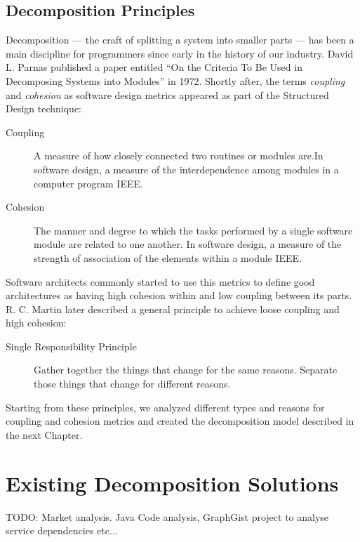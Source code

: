 

\subsection{Decomposition Principles}

Decomposition --- the craft of splitting a system into smaller parts --- has been a main discipline for programmers since early in the history of our industry. David L. Parnas published a paper entitled \enquote{On the Criteria To Be Used in Decomposing Systems into Modules} in 1972\cite{parnaDecomposing}. Shortly after, the terms \textit{coupling} 
and \textit{cohesion} as software design metrics appeared as part of the Structured Design technique\cite{structuredDesign}:

\begin{description}
	\item[Coupling] A measure of how closely connected two routines or modules are.\newline In	software design, a measure of the interdependence among modules in a computer program  IEEE\cite{softwareVocabulary}.
	\item[Cohesion] The manner and degree to which the tasks performed by a single software module are related to one another. \newline 
	In software design, a measure of the strength of association of the elements within a module IEEE\cite{softwareVocabulary}.
\end{description}

Software architects commonly started to use this metrics to define good architectures as having high cohesion within and low coupling between its parts. R. C. Martin later described a general principle to achieve loose coupling and high cohesion:

\begin{description}
	\item[Single Responsibility Principle] Gather together the things that change for the same reasons. Separate those things that change for different reasons.\cite{SRP}
\end{description}

Starting from these principles, we analyzed different types and reasons for coupling and cohesion metrics and created the decomposition model described in the next Chapter.



\section{Existing Decomposition Solutions}

TODO: Market analysis. Java Code analysis, GraphGist project to analyse service dependencies etc...


